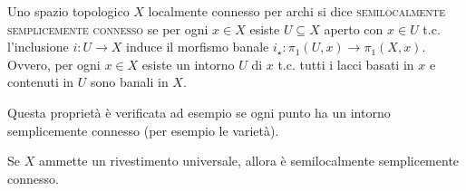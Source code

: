 \begin{defn}
  Uno spazio topologico $X$ localmente connesso per archi si dice \textsc{semilocalmente semplicemente connesso} se per ogni $x \in X$ esiste $U \subseteq X$ aperto con $x \in U$ t.c. l'inclusione $i:U \rightarrow X$ induce il morfismo banale $i_{\star}:\pi_1(U, x) \rightarrow \pi_1(X, x)$. Ovvero, per ogni $x \in X$ esiste un intorno $U$ di $x$ t.c. tutti i lacci basati in $x$ e contenuti in $U$ sono banali in $X$.
\end{defn}

Questa proprietà è verificata ad esempio se ogni punto ha un intorno semplicemente connesso (per esempio le varietà).

\begin{oss}
  Se $X$ ammette un rivestimento universale, allora è semilocalmente semplicemente connesso.
\end{oss}

